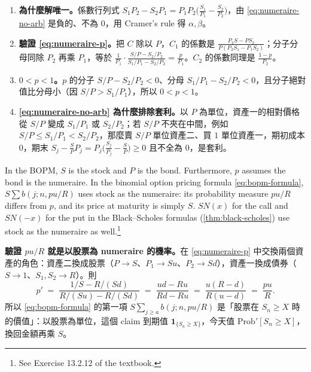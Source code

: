 \begin{remark}
	\begin{enumerate}[(1),nosep]
		\item \textbf{為什麼解唯一。}係數行列式 $S_{1}P_{2}-S_{2}P_{1}=P_{1}P_{2}\bigl(\frac{S_{1}}{P_{1}}-\frac{S_{2}}{P_{2}}\bigr)$，由 \eqref{eq:numeraire-no-arb} 是負的、不為 $0$，用 Cramer's rule 得 $\alpha,\beta$。
		\item \textbf{驗證 \eqref{eq:numeraire-p}。}把 $C$ 除以 $P$，$C_{1}$ 的係數是 $\frac{P_{2}S-PS_{2}}{P(P_{2}S_{1}-P_{1}S_{2})}$；分子分母同除 $P_{2}$ 再乘 $P_{1}$，等於 $\frac{1}{P_{1}}\cdot\frac{S/P-S_{2}/P_{2}}{S_{1}/P_{1}-S_{2}/P_{2}}=\frac{p}{P_{1}}$。$C_{2}$ 的係數同理是 $\frac{1-p}{P_{2}}$。
		\item \textbf{$0<p<1$。}$p$ 的分子 $S/P-S_{2}/P_{2}<0$、分母 $S_{1}/P_{1}-S_{2}/P_{2}<0$，且分子絕對值比分母小（因 $S/P>S_{1}/P_{1}$），所以 $0<p<1$。
		\item \textbf{\eqref{eq:numeraire-no-arb} 為什麼排除套利。}以 $P$ 為單位，資產一的相對價格從 $S/P$ 變成 $S_{1}/P_{1}$ 或 $S_{2}/P_{2}$；若 $S/P$ 不夾在中間，例如 $S/P\le S_{1}/P_{1}<S_{2}/P_{2}$，那麼賣 $S/P$ 單位資產二、買 $1$ 單位資產一，期初成本 $0$，期末 $S_{j}-\frac{S}{P}P_{j}=P_{j}\bigl(\frac{S_{j}}{P_{j}}-\frac{S}{P}\bigr)\ge0$ 且不全為 $0$，是套利。
	\end{enumerate}
\end{remark}
\suppend

In the BOPM, $S$ is the stock and $P$ is the bond.
Furthermore, $p$ assumes the bond is the numeraire.
In the binomial option pricing formula \eqref{eq:bopm-formula}, $S\sum b(j;n,pu/R)$ uses stock as the numeraire: its probability measure $pu/R$ differs from $p$, and its price at maturity is simply $S$.
$SN(x)$ for the call and $SN(-x)$ for the put in the Black--Scholes formulas (\autoref{thm:black-scholes}) use stock as the numeraire as well.\footnote{See Exercise 13.2.12 of the textbook.}

\suppstart
{}

\begin{remark}
	\textbf{驗證 $pu/R$ 就是以股票為 numeraire 的機率。}在 \eqref{eq:numeraire-p} 中交換兩個資產的角色：資產二換成股票（$P\to S$、$P_{1}\to Su$、$P_{2}\to Sd$），資產一換成債券（$S\to1$、$S_{1},S_{2}\to R$）。則
	\[
		p' \;=\; \frac{1/S-R/(Sd)}{R/(Su)-R/(Sd)} \;=\; \frac{ud-Ru}{Rd-Ru} \;=\; \frac{u(R-d)}{R(u-d)} \;=\; \frac{pu}{R} .
	\]
	所以 \eqref{eq:bopm-formula} 的第一項 $S\sum_{j\ge a}b(j;n,pu/R)$ 是「股票在 $S_{n}\ge X$ 時的價值」：以股票為單位，這個 claim 到期值 $\mathbf{1}_{\{S_{n}\ge X\}}$，今天值 $\mathrm{Prob}'[S_{n}\ge X]$，換回金額再乘 $S$。
\end{remark}
\suppend

